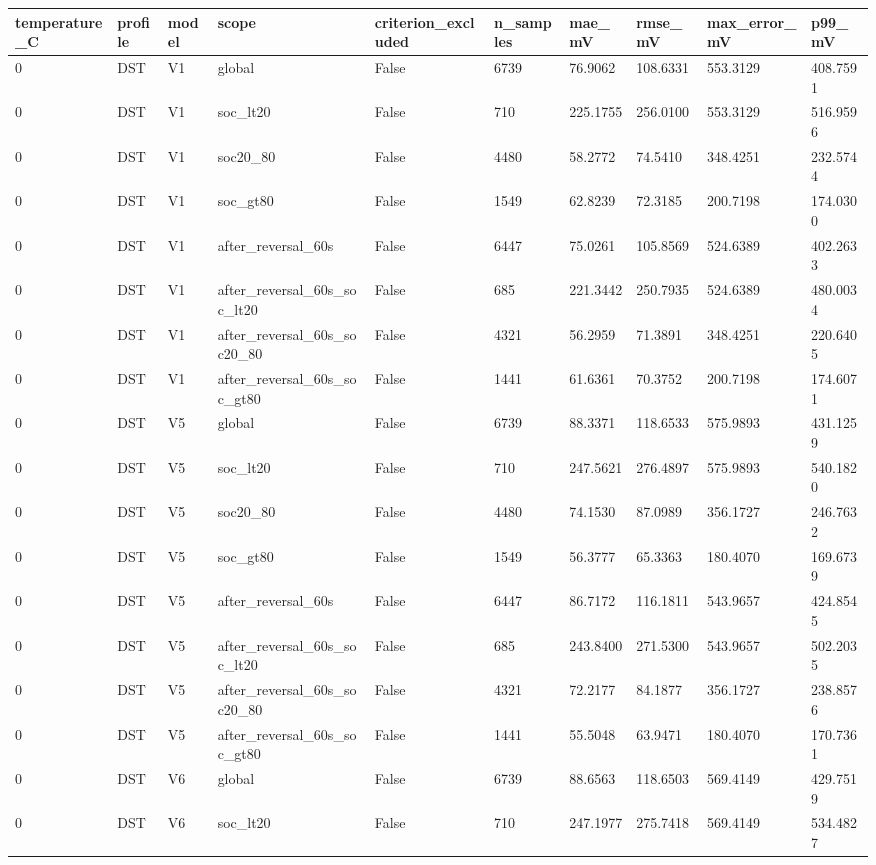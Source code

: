 \begin{tabular}{llllllllll}
\hline
temperature\_C & profile & model & scope & criterion\_excluded & n\_samples & mae\_mV & rmse\_mV & max\_error\_mV & p99\_mV \\
\hline
0 & DST & V1 & global & False & 6739 & 76.9062 & 108.6331 & 553.3129 & 408.7591 \\
0 & DST & V1 & soc\_lt20 & False & 710 & 225.1755 & 256.0100 & 553.3129 & 516.9596 \\
0 & DST & V1 & soc20\_80 & False & 4480 & 58.2772 & 74.5410 & 348.4251 & 232.5744 \\
0 & DST & V1 & soc\_gt80 & False & 1549 & 62.8239 & 72.3185 & 200.7198 & 174.0300 \\
0 & DST & V1 & after\_reversal\_60s & False & 6447 & 75.0261 & 105.8569 & 524.6389 & 402.2633 \\
0 & DST & V1 & after\_reversal\_60s\_soc\_lt20 & False & 685 & 221.3442 & 250.7935 & 524.6389 & 480.0034 \\
0 & DST & V1 & after\_reversal\_60s\_soc20\_80 & False & 4321 & 56.2959 & 71.3891 & 348.4251 & 220.6405 \\
0 & DST & V1 & after\_reversal\_60s\_soc\_gt80 & False & 1441 & 61.6361 & 70.3752 & 200.7198 & 174.6071 \\
0 & DST & V5 & global & False & 6739 & 88.3371 & 118.6533 & 575.9893 & 431.1259 \\
0 & DST & V5 & soc\_lt20 & False & 710 & 247.5621 & 276.4897 & 575.9893 & 540.1820 \\
0 & DST & V5 & soc20\_80 & False & 4480 & 74.1530 & 87.0989 & 356.1727 & 246.7632 \\
0 & DST & V5 & soc\_gt80 & False & 1549 & 56.3777 & 65.3363 & 180.4070 & 169.6739 \\
0 & DST & V5 & after\_reversal\_60s & False & 6447 & 86.7172 & 116.1811 & 543.9657 & 424.8545 \\
0 & DST & V5 & after\_reversal\_60s\_soc\_lt20 & False & 685 & 243.8400 & 271.5300 & 543.9657 & 502.2035 \\
0 & DST & V5 & after\_reversal\_60s\_soc20\_80 & False & 4321 & 72.2177 & 84.1877 & 356.1727 & 238.8576 \\
0 & DST & V5 & after\_reversal\_60s\_soc\_gt80 & False & 1441 & 55.5048 & 63.9471 & 180.4070 & 170.7361 \\
0 & DST & V6 & global & False & 6739 & 88.6563 & 118.6503 & 569.4149 & 429.7519 \\
0 & DST & V6 & soc\_lt20 & False & 710 & 247.1977 & 275.7418 & 569.4149 & 534.4827 \\

\end{tabular}
